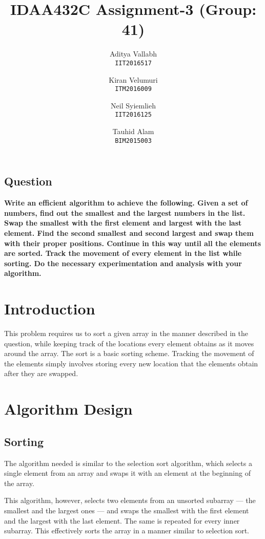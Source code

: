 \documentclass[letterpaper, 11 pt, conference]{ieeeconf}  %
\title{\LARGE 
IDAA432C Assignment-3 (Group: 41)
}
\author{
  Aditya Vallabh\\
  \texttt{IIT2016517}
  \and
  Kiran Velumuri\\
  \texttt{ITM2016009}
  \and
  Neil Syiemlieh\\
  \texttt{IIT2016125}
  \and
  Tauhid Alam\\
  \texttt{BIM2015003}
}
\begin{document}
\maketitle
\thispagestyle{empty}
\pagestyle{empty}



\subsection*{ \textbf{Question} }
\textbf{Write an efficient algorithm to achieve the following. Given a set of numbers, find out the smallest and the largest numbers in the list. Swap the smallest with the first element and largest with the last element. Find the second smallest and second largest and swap them with their proper positions. Continue in this way until all the elements are sorted. Track the movement of every element in the list while sorting. Do the necessary experimentation and analysis with your algorithm.}


\section{Introduction}
This problem requires us to sort a given array in the manner described in the question, while keeping track of the locations every element obtains as it moves around the array. The sort is a basic sorting scheme. Tracking the movement of the elements simply involves storing every new location that the elements obtain after they are swapped.

\section{Algorithm Design}
\subsection{Sorting}
The algorithm needed is similar to the selection sort algorithm, which selects a single element from an array and swaps it with an element at the beginning of the array.

This algorithm, however, selects two elements from an unsorted subarray --- the smallest and the largest ones --- and swaps the smallest with the first element and the largest with the last element. The same is repeated for every inner subarray. This effectively sorts the array in a manner similar to selection sort.
\end{document}
